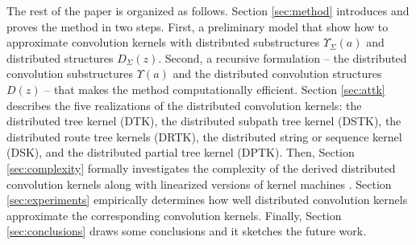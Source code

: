 \documentclass[twoside,11pt]{article}
\def\df{\Upsilon}
\begin{document}
The rest of the paper is organized as follows. Section \ref{sec:method} introduces and proves the method in two steps. First, a preliminary model that show how to approximate convolution kernels with distributed substructures $\df_{\Sigma}(a)$ and distributed structures $D_{\Sigma}(z)$. Second, a recursive formulation -- the distributed convolution substructures $\df(a)$  and the distributed convolution structures $D(z)$ -- 
that makes the method computationally efficient. Section \ref{sec:attk} describes the five realizations of the distributed convolution kernels: the distributed tree kernel (DTK), the distributed subpath tree kernel (DSTK), the distributed route tree kernels (DRTK), the distributed string or sequence kernel (DSK), and the distributed partial tree kernel (DPTK). 
Then, Section \ref{sec:complexity} formally investigates the complexity of the derived distributed convolution kernels along with linearized versions of kernel machines \cite{Joachims:2006:TLS:1150402.1150429,DBLP:journals/mp/Shalev-ShwartzSSC11}.
Section \ref{sec:experiments} empirically determines how well distributed convolution kernels approximate the corresponding convolution kernels.
Finally, Section \ref{sec:conclusions} draws some conclusions and it sketches the future work.
\end{document}
